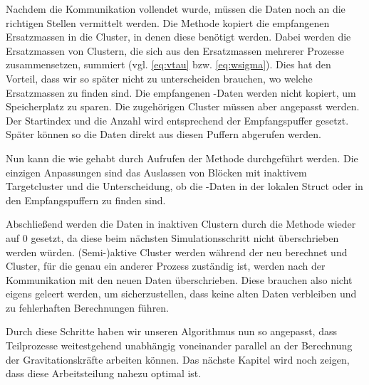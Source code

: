     Nachdem die Kommunikation vollendet wurde, müssen die Daten noch an die richtigen Stellen vermittelt werden. Die Methode  kopiert die empfangenen Ersatzmassen in die 
    Cluster, in denen diese benötigt werden. Dabei werden die Ersatzmassen von Clustern, die sich aus den Ersatzmassen mehrerer Prozesse zusammensetzen, summiert (vgl. \autoref{eq:vtau} bzw. 
    \autoref{eq:wsigma}). Dies hat den Vorteil, dass wir so später nicht zu unterscheiden brauchen, wo welche Ersatzmassen zu finden sind.
    Die empfangenen -Daten werden nicht kopiert, um Speicherplatz zu sparen. Die zugehörigen Cluster müssen aber angepasst werden. Der Startindex und die 
    Anzahl wird entsprechend der Empfangspuffer gesetzt. Später können so die Daten direkt aus diesen Puffern abgerufen werden. 
    
    
    Nun kann die \koppl wie gehabt durch Aufrufen der Methode  durchgeführt werden. Die einzigen Anpassungen sind das Auslassen von Blöcken mit inaktivem Targetcluster und die 
    Unterscheidung, ob die -Daten in der lokalen  Struct oder in den Empfangspuffern zu finden sind.
    
    Abschließend werden die Daten in inaktiven Clustern durch die Methode  wieder auf $0$ gesetzt, da diese beim nächsten Simulationsschritt nicht überschrieben
    werden würden. (Semi-)aktive Cluster werden während der \vorw neu berechnet und Cluster, für die genau ein anderer Prozess zuständig ist, werden nach der Kommunikation mit den neuen Daten 
    überschrieben. Diese brauchen also nicht eigens geleert werden, um sicherzustellen, dass keine alten Daten verbleiben und zu fehlerhaften Berechnungen führen.
    
    Durch diese Schritte haben wir unseren Algorithmus nun so angepasst, dass Teilprozesse weitestgehend unabhängig voneinander parallel an der Berechnung der Gravitationskräfte arbeiten können.
    Das nächste Kapitel wird noch zeigen, dass diese Arbeitsteilung nahezu optimal ist.